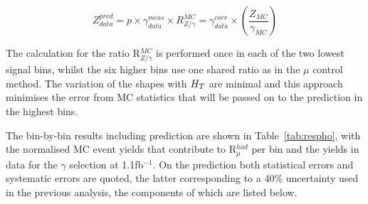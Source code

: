 \begin{equation}
Z^{pred}_{data} = p \times \gamma^{meas}_{data}\times R^{MC}_{Z/\gamma} = \gamma^{corr}_{data}\times (\frac{Z_{MC}}{\gamma_{MC}})
\label{eq:phopred}
\end{equation}

The calculation for the ratio R$^{MC}_{Z/\gamma}$ is performed once in each of the two lowest signal bins, whilst the six higher bins use one shared ratio as in the $\mu$ control method. The variation of the shapes with $H_{T}$ are minimal and this approach minimises the error from MC statistics that will be passed on to the prediction in the highest bins.

The bin-by-bin results including prediction are shown in Table~\ref{tab:respho}, with the normalised MC event yields that contribute to R$^{had}_{\mu}$ per bin and the yields in data for the $\gamma$ selection at 1.1fb$^{-1}$. On the prediction both statistical errors and systematic errors are quoted, the latter corresponding to a 40\% uncertainty used in the previous analysis, the components of which are listed below.

